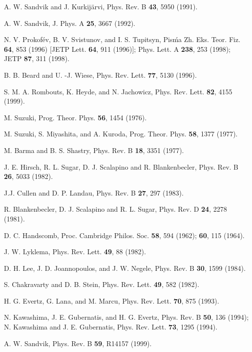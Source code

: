 \documentclass[10pt,pre,aps,twocolumn,showpacs,superscriptaddress,
floatfix]{revtex4}
\begin{document}
\begin{thebibliography}{00}
A. W. Sandvik and J. Kurkij{\"a}rvi, Phys. Rev. B {\bf 43}, 5950 (1991).

A. W. Sandvik, J. Phys. A {\bf 25}, 3667 (1992).

N. V. Prokof\'ev, B. V. Svistunov, and I. S. Tupitsyn, Pis\'ma Zh. Eks. 
Teor. Fiz. {\bf 64}, 853 (1996) [JETP Lett. {\bf 64}, 911 (1996)];
Phys. Lett. A {\bf 238}, 253 (1998); JETP {\bf 87}, 311 (1998).

B. B. Beard and U. -J. Wiese, Phys. Rev. Lett. {\bf 77}, 5130 (1996).

S. M. A. Rombouts, K. Heyde, and N. Jachowicz, Phys. Rev. Lett. {\bf 82},
4155 (1999).

M. Suzuki, Prog. Theor. Phys. {\bf 56}, 1454 (1976).

M. Suzuki, S. Miyashita, and A. Kuroda, Prog. Theor. Phys. {\bf 58}, 
1377 (1977).

M. Barma and B. S. Shastry, Phys. Rev. B {\bf 18}, 3351 (1977).

J. E. Hirsch, R. L. Sugar, D. J. Scalapino and R. Blankenbecler,
Phys. Rev. B {\bf 26}, 5033 (1982).

J.J. Cullen and D. P. Landau, Phys. Rev. B {\bf 27}, 297 (1983).

R. Blankenbecler, D. J. Scalapino and R. L. Sugar, 
Phys. Rev. D {\bf 24}, 2278 (1981).

D. C. Handscomb, Proc. Cambridge Philos. Soc. {\bf 58}, 594 (1962);
{\bf 60}, 115 (1964).

J. W. Lyklema, Phys. Rev. Lett. {\bf 49}, 88 (1982).

D. H. Lee, J. D. Joannopoulos, and J. W. Negele, Phys. Rev. B {\bf 30}, 
1599 (1984).

S. Chakravarty and D. B. Stein, Phys. Rev. Lett. {\bf 49}, 582 (1982).

H. G. Evertz, G. Lana, and M. Marcu, Phys. Rev. Lett. {\bf 70}, 875 (1993).

N. Kawashima, J. E. Gubernatis, and H. G. Evertz, Phys. Rev. B {\bf 50},
136 (1994); N. Kawashima and J. E. Gubernatis, Phys. Rev. Lett. {\bf 73}, 
1295 (1994).

A. W. Sandvik, Phys. Rev. B {\bf 59}, R14157 (1999).


\end{thebibliography}
\end{document}
